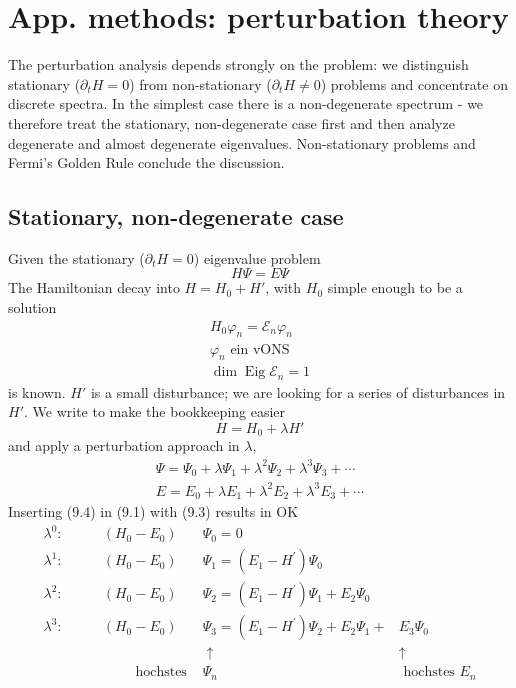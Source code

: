 \chapter{App. methods: perturbation theory}
The perturbation analysis depends strongly on the problem: we distinguish stationary ($\partial_tH = 0$) from non-stationary ($\partial_tH \neq 0$) problems and concentrate on discrete spectra. In the simplest case there is a non-degenerate spectrum - we therefore treat the stationary, non-degenerate case first and then analyze degenerate and almost degenerate eigenvalues. Non-stationary problems and Fermi's Golden Rule conclude the discussion.

\section{Stationary, non-degenerate case}
Given the stationary ($\partial_tH = 0$) eigenvalue problem
\begin{equation}
    H\Psi=E\Psi
\end{equation}
The Hamiltonian decay into $H = H_0 + H'$, with $H_0$ simple enough to be a solution
\begin{equation}
\begin{array}{c}{H_{0} \varphi_{n}=\mathcal{E}_{n} \varphi_{n}} \\ {\varphi_{n} \text { ein vONS }} \\ {\operatorname{dim} \operatorname{Eig} \mathcal{E}_{n}=1}\end{array}
\end{equation}
is known. $H'$ is a small disturbance; we are looking for a series of disturbances in $H'$. We write to make the bookkeeping easier
\begin{equation}
    H=H_0+\lambda H'
\end{equation}
and apply a perturbation approach in $\lambda$,
\begin{equation}
\begin{array}{l}{\Psi=\Psi_{0}+\lambda \Psi_{1}+\lambda^{2} \Psi_{2}+\lambda^{3} \Psi_{3}+\cdots} \\ {E=E_{0}+\lambda E_{1}+\lambda^{2} E_{2}+\lambda^{3} E_{3}+\cdots}\end{array}
\end{equation}
Inserting (9.4) in (9.1) with (9.3) results in OK
\begin{equation}
\begin{array}{ccll} 
\lambda^{0}: \qquad&\left(H_{0}-E_{0}\right) &\Psi_{0}=0 \\ 
\lambda^{1}: \qquad&\left(H_{0}-E_{0}\right) &\Psi_{1}=\left(E_{1}-H^{\prime}\right) \Psi_{0} \\ 
\lambda^{2}: \qquad&\left(H_{0}-E_{0}\right) &\Psi_{2}=\left(E_{1}-H^{\prime}\right) \Psi_{1}+E_{2} \Psi_{0} \\ 
\lambda^{3}: \qquad&\left(H_{0}-E_{0}\right) &\Psi_{3}=\left(E_{1}-H^{\prime}\right) \Psi_{2}+E_{2} \Psi_{1}+&E_{3} \Psi_{0} \\ 
& &\;\uparrow  \qquad\qquad\qquad\qquad &\uparrow \\ 
& \qquad \text { hochstes } &\Psi_{n} &\text { hochstes } E_n
\end{array}
\end{equation}
